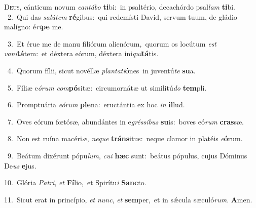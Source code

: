 \lettrine{\initial\textcolor{\initialcolor}{D}}{eus,} cánticum novum \textit{can}\-\textit{tá}\textit{bo} \textbf{ti}\-bi:~\star in psaltério, decachórdo psal\textit{lam} \textbf{ti}\-bi.\\
{\numbfont\textcolor{\numbcolor}{~2.}}~Qui das \textit{sa}\-\textit{lú}\textit{tem} \textbf{ré}\-gibus:~\star qui redemísti David, servum tuum, de gládio malígno: é\-\textit{ri}\-\textbf{pe} me.\par
{\numbfont\textcolor{\numbcolor}{~3.}}~Et érue me de manu filiórum alienórum,~\dagger quorum os locútum \textit{est} \textit{va}\-\textit{ni}\textbf{tá}tem:~\star et déxtera eórum, déxtera ini\-\textit{qui}\-\textbf{tá}tis.\par
{\numbfont\textcolor{\numbcolor}{~4.}}~Quorum fílii, sicut novéllæ \textit{plan}\-\textit{ta}\textit{ti}\textbf{ó}nes~\star in juventú\textit{te} \textbf{su}\-a.\par
{\numbfont\textcolor{\numbcolor}{~5.}}~Fíliæ e\-\textit{ó}\-\textit{rum} \textit{com}\-\textbf{pó}sitæ:~\star circumornátæ ut similitú\textit{do} \textbf{tem}\-pli.\par
{\numbfont\textcolor{\numbcolor}{~6.}}~Promptuária \textit{e}\-\textit{ó}\textit{rum} \textbf{ple}\-na:~\star eructántia ex hoc \textit{in} \textbf{il}\-lud.\par
{\numbfont\textcolor{\numbcolor}{~7.}}~Oves eórum fœtósæ, abundántes in e\-\textit{grés}\-\textit{si}\textit{bus} \textbf{su}\-is:~\star boves eó\textit{rum} \textbf{cras}\-sæ.\par
{\numbfont\textcolor{\numbcolor}{~8.}}~Non est ruína macéri\-\textit{æ}\-, \textit{ne}\-\textit{que} \textbf{tráns}\-itus:~\star neque clamor in platéis \textit{e}\-\textbf{ó}rum.\par
{\numbfont\textcolor{\numbcolor}{~9.}}~Beátum dixérunt pópu\-\textit{lum}\-, \textit{cu}\-\textit{i} \textbf{hæc} sunt:~\star beátus pópulus, cujus Dóminus De\textit{us} \textbf{e}\-jus.\par
{\numbfont\textcolor{\numbcolor}{10.}}~Glória \textit{Pa}\-\textit{tri}, \textit{et} \textbf{Fí}\-lio,~\star et Spirítu\textit{i} \textbf{Sanc}\-to.\par
{\numbfont\textcolor{\numbcolor}{11.}}~Sicut erat in princípio, \textit{et} \textit{nunc}\-, \textit{et} \textbf{sem}\-per,~\star et in sǽcula sæculó\-\textit{rum}\-. \textbf{A}\-men.\par
